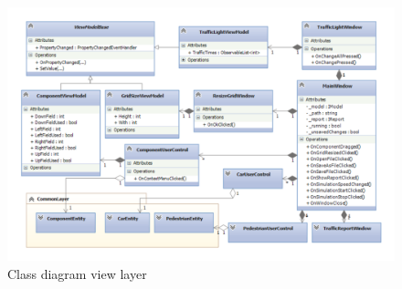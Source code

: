 \begin{landscape}
	\begin{figure}[!ht]
		\centering
		\includegraphics[height=\textheight]{figures/PresentationLayer}
		\caption{Class diagram view layer}
		\label{fig:pres}
	\end{figure}
\end{landscape}




